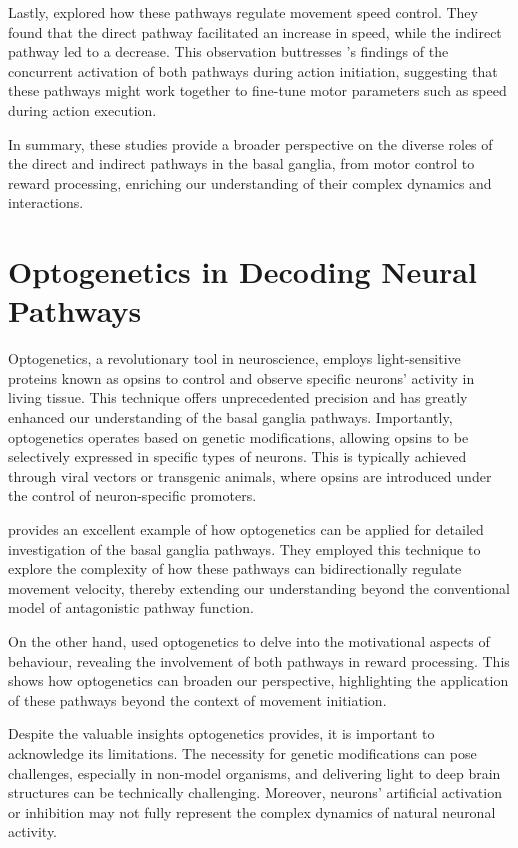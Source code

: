 \documentclass[10pt]{article}
\begin{document}
\begin{sloppypar}
  Lastly, \cite{wang_direct_2015} explored how these pathways regulate movement speed control. They found that the direct pathway facilitated an increase in speed, while the indirect pathway led to a decrease. This observation buttresses \cite{cui_concurrent_2013} ’s findings of the concurrent activation of both pathways during action initiation, suggesting that these pathways might work together to fine-tune motor parameters such as speed during action execution.

  In summary, these studies provide a broader perspective on the diverse roles of the direct and indirect pathways in the basal ganglia, from motor control to reward processing, enriching our understanding of their complex dynamics and interactions.

  \section{Optogenetics in Decoding Neural Pathways}
  \label{sec:the-role-of-optogenetics-in-neural-pathways}

  Optogenetics, a revolutionary tool in neuroscience, employs light-sensitive proteins known as opsins to control and observe specific neurons’ activity in living tissue. This technique offers unprecedented precision and has greatly enhanced our understanding of the basal ganglia pathways. Importantly, optogenetics operates based on genetic modifications, allowing opsins to be selectively expressed in specific types of neurons. This is typically achieved through viral vectors or transgenic animals, where opsins are introduced under the control of neuron-specific promoters.

  \cite{yttri_opponent_2016} provides an excellent example of how optogenetics can be applied for detailed investigation of the basal ganglia pathways. They employed this technique to explore the complexity of how these pathways can bidirectionally regulate movement velocity, thereby extending our understanding beyond the conventional model of antagonistic pathway function.

  On the other hand, \cite{guillaumin_experimental_2021} used optogenetics to delve into the motivational aspects of behaviour, revealing the involvement of both pathways in reward processing. This shows how optogenetics can broaden our perspective, highlighting the application of these pathways beyond the context of movement initiation.

  Despite the valuable insights optogenetics provides, it is important to acknowledge its limitations. The necessity for genetic modifications can pose challenges, especially in non-model organisms, and delivering light to deep brain structures can be technically challenging. Moreover, neurons’ artificial activation or inhibition may not fully represent the complex dynamics of natural neuronal activity.


\end{sloppypar}
\end{document}
